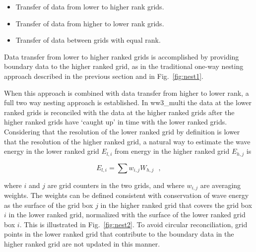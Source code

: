 \begin{itemize}
\item Transfer of data from lower to higher rank grids.
\item Transfer of data from higher to lower rank grids.
\item Transfer of data between grids with equal rank.
\end{itemize}

Data transfer from lower to higher ranked grids is accomplished by providing
boundary data to the higher ranked grid, as in the traditional one-way nesting
approach described in the previous section and in Fig.~\ref{fig:nest1}.

When this approach is combined with data transfer from higher to lower rank, a
full two way nesting approach is established. In {\file ww3\_multi} the data
at the lower ranked grids is reconciled with the data at the higher ranked
grids after the higher ranked grids have `caught up' in time with the lower
ranked grids.  Considering that the resolution of the lower ranked grid by
definition is lower that the resolution of the higher ranked grid, a natural
way to estimate the wave energy in the lower ranked grid $E_{l,i}$ from energy
in the higher ranked grid $E_{h,j}$ is

\begin{equation}
E_{l,i} = \sum w_{i,j} W_{h,j} \:\:\: , \label{eq:nest_hg1}
\end{equation}

\noindent
where $i$ and $j$ are grid counters in the two grids, and where $w_{i,j}$ are
averaging weights. The weights can be defined consistent with conservation of
wave energy as the surface of the grid box $j$ in the higher ranked grid that
covers the grid box $i$ in the lower ranked grid, normalized with the surface
of the lower ranked grid box $i$. This is illustrated in Fig.~\ref{fig:nest2}.
To avoid circular reconciliation, grid points in the lower ranked grid that
contribute to the boundary data in the higher ranked grid are not updated in
this manner.



